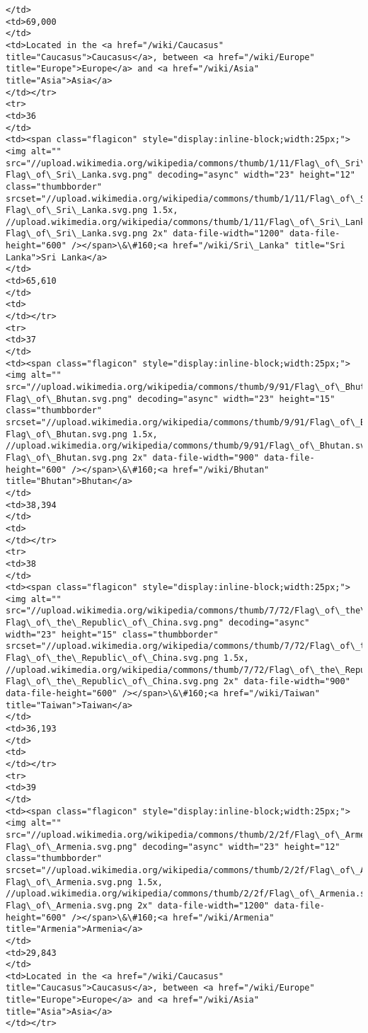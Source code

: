 \documentclass[11pt]{article}
\begin{document}
\begin{Verbatim}[commandchars=\\\{\}]
</td>
<td>69,000
</td>
<td>Located in the <a href="/wiki/Caucasus" title="Caucasus">Caucasus</a>, between <a href="/wiki/Europe" title="Europe">Europe</a> and <a href="/wiki/Asia" title="Asia">Asia</a>
</td></tr>
<tr>
<td>36
</td>
<td><span class="flagicon" style="display:inline-block;width:25px;"><img alt="" src="//upload.wikimedia.org/wikipedia/commons/thumb/1/11/Flag\_of\_Sri\_Lanka.svg/23px-Flag\_of\_Sri\_Lanka.svg.png" decoding="async" width="23" height="12" class="thumbborder" srcset="//upload.wikimedia.org/wikipedia/commons/thumb/1/11/Flag\_of\_Sri\_Lanka.svg/35px-Flag\_of\_Sri\_Lanka.svg.png 1.5x, //upload.wikimedia.org/wikipedia/commons/thumb/1/11/Flag\_of\_Sri\_Lanka.svg/46px-Flag\_of\_Sri\_Lanka.svg.png 2x" data-file-width="1200" data-file-height="600" /></span>\&\#160;<a href="/wiki/Sri\_Lanka" title="Sri Lanka">Sri Lanka</a>
</td>
<td>65,610
</td>
<td>
</td></tr>
<tr>
<td>37
</td>
<td><span class="flagicon" style="display:inline-block;width:25px;"><img alt="" src="//upload.wikimedia.org/wikipedia/commons/thumb/9/91/Flag\_of\_Bhutan.svg/23px-Flag\_of\_Bhutan.svg.png" decoding="async" width="23" height="15" class="thumbborder" srcset="//upload.wikimedia.org/wikipedia/commons/thumb/9/91/Flag\_of\_Bhutan.svg/35px-Flag\_of\_Bhutan.svg.png 1.5x, //upload.wikimedia.org/wikipedia/commons/thumb/9/91/Flag\_of\_Bhutan.svg/45px-Flag\_of\_Bhutan.svg.png 2x" data-file-width="900" data-file-height="600" /></span>\&\#160;<a href="/wiki/Bhutan" title="Bhutan">Bhutan</a>
</td>
<td>38,394
</td>
<td>
</td></tr>
<tr>
<td>38
</td>
<td><span class="flagicon" style="display:inline-block;width:25px;"><img alt="" src="//upload.wikimedia.org/wikipedia/commons/thumb/7/72/Flag\_of\_the\_Republic\_of\_China.svg/23px-Flag\_of\_the\_Republic\_of\_China.svg.png" decoding="async" width="23" height="15" class="thumbborder" srcset="//upload.wikimedia.org/wikipedia/commons/thumb/7/72/Flag\_of\_the\_Republic\_of\_China.svg/35px-Flag\_of\_the\_Republic\_of\_China.svg.png 1.5x, //upload.wikimedia.org/wikipedia/commons/thumb/7/72/Flag\_of\_the\_Republic\_of\_China.svg/45px-Flag\_of\_the\_Republic\_of\_China.svg.png 2x" data-file-width="900" data-file-height="600" /></span>\&\#160;<a href="/wiki/Taiwan" title="Taiwan">Taiwan</a>
</td>
<td>36,193
</td>
<td>
</td></tr>
<tr>
<td>39
</td>
<td><span class="flagicon" style="display:inline-block;width:25px;"><img alt="" src="//upload.wikimedia.org/wikipedia/commons/thumb/2/2f/Flag\_of\_Armenia.svg/23px-Flag\_of\_Armenia.svg.png" decoding="async" width="23" height="12" class="thumbborder" srcset="//upload.wikimedia.org/wikipedia/commons/thumb/2/2f/Flag\_of\_Armenia.svg/35px-Flag\_of\_Armenia.svg.png 1.5x, //upload.wikimedia.org/wikipedia/commons/thumb/2/2f/Flag\_of\_Armenia.svg/46px-Flag\_of\_Armenia.svg.png 2x" data-file-width="1200" data-file-height="600" /></span>\&\#160;<a href="/wiki/Armenia" title="Armenia">Armenia</a>
</td>
<td>29,843
</td>
<td>Located in the <a href="/wiki/Caucasus" title="Caucasus">Caucasus</a>, between <a href="/wiki/Europe" title="Europe">Europe</a> and <a href="/wiki/Asia" title="Asia">Asia</a>
</td></tr>


\end{Verbatim}
\end{document}
